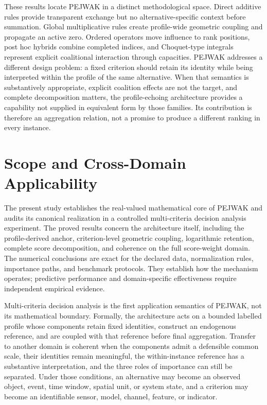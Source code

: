 \documentclass[reqno,11pt]{amsart}
\theoremstyle{definition}
\theoremstyle{plain}
\theoremstyle{remark}
\begin{document}
These results locate PEJWAK in a distinct methodological space. Direct
additive rules provide transparent exchange but no alternative-specific
context before summation. Global multiplicative rules create profile-wide
geometric coupling and propagate an active zero. Ordered operators move
influence to rank positions, post hoc hybrids combine completed indices,
and Choquet-type integrals represent explicit coalitional interaction
through capacities. PEJWAK addresses a different design problem: a fixed
criterion should retain its identity while being interpreted within the
profile of the same alternative. When that semantics is substantively
appropriate, explicit coalition effects are not the target, and complete
decomposition matters, the profile-echoing architecture provides a
capability not supplied in equivalent form by those families. Its
contribution is therefore an aggregation relation, not a promise to
produce a different ranking in every instance.

\section{Scope and Cross-Domain Applicability}
\label{sec:limitations}

The present study establishes the real-valued mathematical core of
PEJWAK and audits its canonical realization in a controlled
multi-criteria decision analysis experiment. The proved results concern
the architecture itself, including the profile-derived anchor,
criterion-level geometric coupling, logarithmic retention, complete score
decomposition, and coherence on the full score-weight domain. The
numerical conclusions are exact for the declared data, normalization
rules, importance paths, and benchmark protocols. They establish how the
mechanism operates; predictive performance and domain-specific
effectiveness require independent empirical evidence.

Multi-criteria decision analysis is the first application semantics of
PEJWAK, not its mathematical boundary. Formally, the architecture acts on
a bounded labelled profile whose components retain fixed identities,
construct an endogenous reference, and are coupled with that reference
before final aggregation. Transfer to another domain is coherent when the
components admit a defensible common scale, their identities remain
meaningful, the within-instance reference has a substantive
interpretation, and the three roles of importance can still be
separated. Under those conditions, an alternative may become an observed
object, event, time window, spatial unit, or system state, and a criterion
may become an identifiable sensor, model, channel, feature, or indicator.
\end{document}
